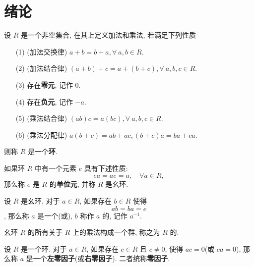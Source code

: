 \newpage

\chapter*{绪论}




\begin{definition}\label{环}
	设 $R$ 是一个非空集合, 在其上定义加法和乘法, 若满足下列性质
	\begin{itemize}[leftmargin=1.5cm]
		\item[(1)](加法交换律) $a+b=b+a,\forall\ a,b\in R$.
		\item[(2)](加法结合律) $(a+b)+c = a+(b+c),\forall\ a,b,c\in R$.
		\item[(3)] 存在\textbf{零元}, 记作 $0$.
		\item[(4)] 存在\textbf{负元}, 记作 $-a$.
		\item[(5)](乘法结合律) $(ab)c=a(bc),\forall\ a,b,c\in R$.
		\item[(6)](乘法分配律) $a(b+c)=ab+ac,(b+c)a=ba+ca$.
	\end{itemize}
	则称 $R$ 是一个\textbf{环}.
\end{definition}

\begin{definition}\label{环的单位元}
	如果环 $R$ 中有一个元素 $e$ 具有下述性质: $$ea=ae=a,\quad\forall a\in R,$$ 那么称 $e$ 是 $R$ 的\textbf{单位元}, 并称 $R$ 是幺环.
\end{definition}

\begin{definition}
	设 $R$ 是幺环. 对于 $a\in R$,  如果存在 $b\in R$ 使得 $$ab=ba=e$$, 那么称 $a$ 是一个(或), $b$ 称作 $a$ 的, 记作 $a^{-1}$.
\end{definition}

\begin{definition}
	幺环 $R$ 的所有关于 $R$ 上的乘法构成一个群, 称之为 $R$ 的.
\end{definition}

\begin{definition}\label{零因子}
	设 $R$ 是一个环. 对于 $a\in R$, 如果存在 $c\in R$ 且 $c\neq 0$, 使得 $ac=0$(或 $ca=0$), 那么称 $a$ 是一个\textbf{左零因子}(或\textbf{右零因子}). 二者统称\textbf{零因子}.
\end{definition}


